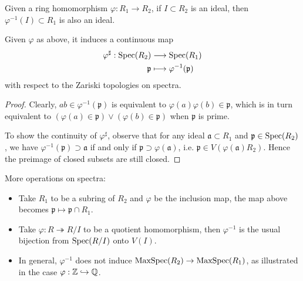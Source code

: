 Given a ring homomorphism $\varphi: R_1 \to R_2$, if $I \subset R_2$ is an ideal, then $\varphi^{-1}(I) \subset R_1$ is also an ideal.
\begin{proposition}
	Given $\varphi$ as above, it induces a continuous map
	\begin{align*}
		\varphi^\sharp: \operatorname{Spec}(R_2) & \longrightarrow \operatorname{Spec}(R_1) \\
		\mathfrak{p} & \longmapsto \varphi^{-1}(\mathfrak{p})
	\end{align*}
	with respect to the Zariski topologies on spectra.
\end{proposition}
\begin{proof}
	Clearly, $ab \in \varphi^{-1}(\mathfrak{p})$ is equivalent to $\varphi(a)\varphi(b) \in \mathfrak{p}$, which is in turn equivalent to $(\varphi(a) \in \mathfrak{p}) \vee (\varphi(b) \in \mathfrak{p})$ when $\mathfrak{p}$ is prime.
	
	To show the continuity of $\varphi^\sharp$, observe that for any ideal $\mathfrak{a} \subset R_1$ and $\mathfrak{p} \in \operatorname{Spec}(R_2)$, we have $\varphi^{-1}(\mathfrak{p}) \supset \mathfrak{a}$ if and only if $\mathfrak{p} \supset \varphi(\mathfrak{a})$, i.e. $\mathfrak{p} \in V(\varphi(\mathfrak{a}) R_2)$. Hence the preimage of closed subsets are still closed.
\end{proof}

More operations on spectra:
\begin{itemize}
	\item Take $R_1$ to be a subring of $R_2$ and $\varphi$ be the inclusion map, the map above becomes $\mathfrak{p} \mapsto \mathfrak{p} \cap R_1$.
	\item Take $\varphi: R \twoheadrightarrow R/I$ to be a quotient homomorphism, then $\varphi^{-1}$ is the usual bijection from $\operatorname{Spec}(R/I)$ onto $V(I)$.
	\item In general, $\varphi^{-1}$ does not induce $\operatorname{MaxSpec}(R_2) \to \operatorname{MaxSpec}(R_1)$, as illustrated in the case $\varphi: \mathbb{Z} \hookrightarrow \mathbb{Q}$.
\end{itemize}

